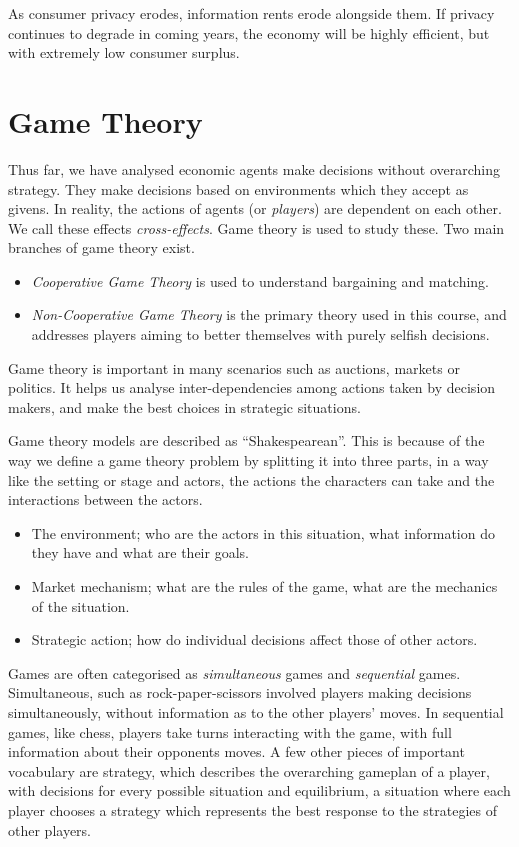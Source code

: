 \documentclass[12pt]{report}
\begin{document}
\begin{flushleft}
\bigskip
As consumer privacy erodes, information rents erode alongside them. If privacy
continues to degrade in coming years, the economy will be highly efficient, but
with extremely low consumer surplus.

\section*{Game Theory}
Thus far, we have analysed economic agents make decisions without overarching 
strategy. They make decisions based on environments which they accept as 
givens. In reality, the actions of agents (or \textit{players}) are dependent
on each other. We call these effects \textit{cross-effects}. Game theory is 
used to study these. Two main branches of game theory exist.

\begin{itemize}
    \item \textit{Cooperative Game Theory} is used to understand bargaining and
    matching.
    \item \textit{Non-Cooperative Game Theory} is the primary theory used in 
    this course, and addresses players aiming to better themselves with purely
    selfish decisions.
\end{itemize}

Game theory is important in many scenarios such as auctions, markets or 
politics. It helps us analyse inter-dependencies among actions taken by 
decision makers, and make the best choices in strategic situations.

\bigskip
Game theory models are described as ``Shakespearean''. This is because of the
way we define a game theory problem by splitting it into three parts, in a way
like the setting or stage and actors, the actions the characters can take and 
the interactions between the actors.

\begin{itemize}
    \item The environment; who are the actors in this situation, what 
    information do they have and what are their goals.
    \item Market mechanism; what are the rules of the game, what are the 
    mechanics of the situation.
    \item Strategic action; how do individual decisions affect those of other
    actors.
\end{itemize}

Games are often categorised as \textit{simultaneous} games and 
\textit{sequential} games. Simultaneous, such as rock-paper-scissors involved
players making decisions simultaneously, without information as to the other
players' moves. In sequential games, like chess, players take turns interacting
with the game, with full information about their opponents moves. A few other
pieces of important vocabulary are strategy, which describes the overarching
gameplan of a player, with decisions for every possible situation and 
equilibrium, a situation where each player chooses a strategy which represents
the best response to the strategies of other players.


\end{flushleft}
\end{document}
